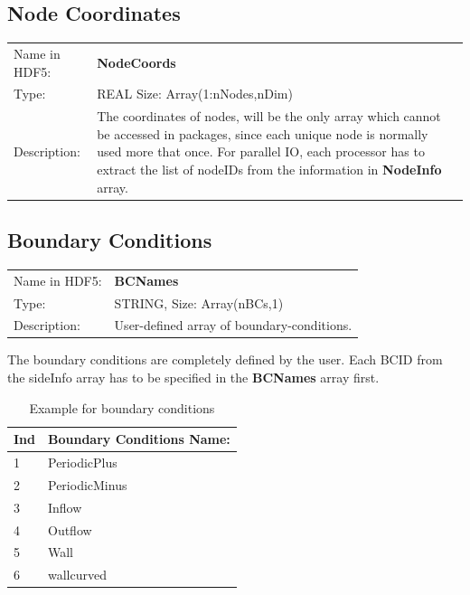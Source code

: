 \newpage

\subsection{Node Coordinates}

\begin{table}[h!]
\begin{tabularx}{1.0\textwidth}{lX}
Name in HDF5: & \textbf{NodeCoords}\\
Type:         & REAL \quad Size: Array(1:nNodes,nDim) \\
Description:  & The coordinates of nodes, will be the only array which cannot be accessed in packages, since each unique node is normally used more that once. For parallel IO, each processor has to extract the list of nodeIDs from the information in \textbf{NodeInfo} array. \\
\end{tabularx}
\end{table}


\newpage

\subsection{Boundary Conditions}

\begin{table}[h!]
\begin{tabularx}{1.0\textwidth}{lX}
Name in HDF5: & \textbf{BCNames} \\
Type:         & STRING, Size: Array(nBCs,1)  \\
Description:  & User-defined array of boundary-conditions. \\
\end{tabularx}
\end{table}

The boundary conditions are completely defined by the user. Each BCID from the sideInfo array has to be specified in the \textbf{BCNames} array first.

\begin{table}[h!]
\centering
\begin{tabular}{|l|l|} \hline
Ind & Boundary Conditions Name: \\ \hline
1   &  PeriodicPlus\\
2   &  PeriodicMinus\\
3   &  Inflow\\
4   &  Outflow\\
5   &  Wall\\
6   &  wallcurved\\ \hline
\end{tabular}
\caption{Example for boundary conditions}
\end{table}


